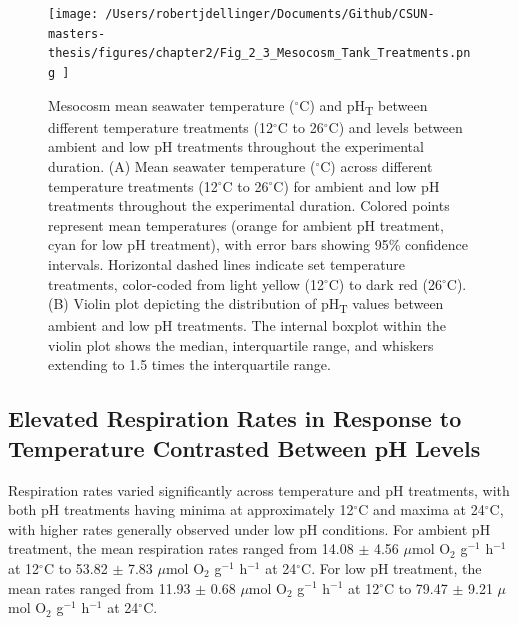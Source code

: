 \documentclass{CSUNthesis}
\begin{document}
\begin{figure}[H]
  \centering
  \texttt{[image:  /Users/robertjdellinger/Documents/Github/CSUN-masters-thesis/figures/chapter2/Fig\_2\_3\_Mesocosm\_Tank\_Treatments.png ]}
  \caption[Mesocosm mean seawater temperature and pH\textsubscript{T} across temperature and pH treatments.]{Mesocosm mean seawater temperature ($^\circ$C) and pH\textsubscript{T} between different temperature treatments (12$^\circ$C to 26$^\circ$C) and levels between ambient and low pH treatments throughout the experimental duration. (A) Mean seawater temperature ($^\circ$C) across different temperature treatments (12$^\circ$C to 26$^\circ$C) for ambient and low pH treatments throughout the experimental duration. Colored points represent mean temperatures (orange for ambient pH treatment, cyan for low pH treatment), with error bars showing 95\% confidence intervals. Horizontal dashed lines indicate set temperature treatments, color-coded from light yellow (12$^\circ$C) to dark red (26$^\circ$C). (B) Violin plot depicting the distribution of pH\textsubscript{T} values between ambient and low pH treatments. The internal boxplot within the violin plot shows the median, interquartile range, and whiskers extending to 1.5 times the interquartile range.}
  \label{fig:mesocosm_tank_treatments}
\end{figure}

\newpage

\subsection*{Elevated Respiration Rates in Response to Temperature Contrasted Between pH Levels}\label{elevated-respiration-rates-in-response-to-temperature-contrasted-between-ph-levels}

Respiration rates varied significantly across temperature and pH treatments, with both pH treatments having minima at approximately 12\(^\circ\)C and maxima at 24\(^\circ\)C, with higher rates generally observed under low pH conditions. For ambient pH treatment, the mean respiration rates ranged from 14.08 \(\pm\) 4.56 \(\mu\)mol O\(_2\) g\(^{-1}\) h\(^{-1}\) at 12\(^\circ\)C to 53.82 \(\pm\) 7.83 \(\mu\)mol O\(_2\) g\(^{-1}\) h\(^{-1}\) at 24\(^\circ\)C. For low pH treatment, the mean rates ranged from 11.93 \(\pm\) 0.68 \(\mu\)mol O\(_2\) g\(^{-1}\) h\(^{-1}\) at 12\(^\circ\)C to 79.47 \(\pm\) 9.21 \(\mu\)mol O\(_2\) g\(^{-1}\) h\(^{-1}\) at 24\(^\circ\)C.
\end{document}
